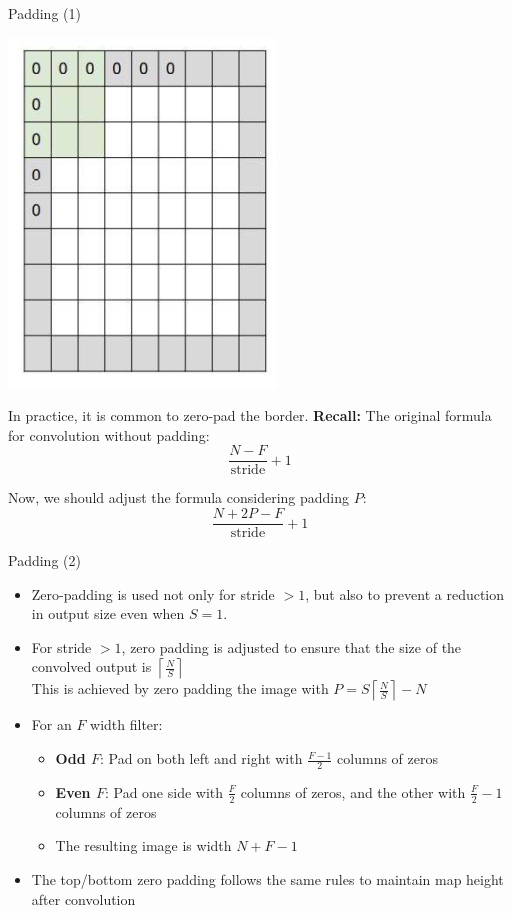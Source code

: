 \documentclass[serif, aspectratio=169]{beamer}
\begin{document}
	\begin{frame}{Padding (1)}
		
		\begin{minipage}{0.28\textwidth} %
			\includegraphics[keepaspectratio, scale=0.6]{pic/zeropad.png}
		\end{minipage}
		\begin{minipage}{0.67\textwidth} %
			In practice, it is common to zero-pad the border.
			\smallskip
			\textbf{Recall:} The original formula for convolution without padding:
			\[
			\frac{N - F}{\text{stride}} + 1
			\]
			
			Now, we should adjust the formula considering padding $P$:
			\[
			\frac{N + 2P - F}{\text{stride}} + 1
			\]
		\end{minipage}
	\end{frame}
	\begin{frame}{Padding (2)}
		\begin{itemize}
			\item Zero-padding is used not only for stride $> 1$, but also to prevent a reduction in output size even when $S = 1$.
			
			\item For stride $> 1$, zero padding is adjusted to ensure that the size of the convolved output is $\left\lceil \frac{N}{S} \right\rceil$
			\\
			This is achieved by zero padding the image with  $ P = S\left\lceil \frac{N}{S} \right\rceil - N$
			
			\item For an $F$ width filter:
				\begin{itemize}
					\item \textbf{Odd $F$}: Pad on both left and right with $\frac{F-1}{2}$ columns of zeros
					\item \textbf{Even $F$}: Pad one side with $\frac{F}{2}$ columns of zeros, and the other with $\frac{F}{2} - 1$ columns of zeros
					\item The resulting image is width $N + F - 1$
				\end{itemize}
			\item The top/bottom zero padding follows the same rules to maintain map height after convolution
			
		\end{itemize}
	\end{frame}
\end{document}
